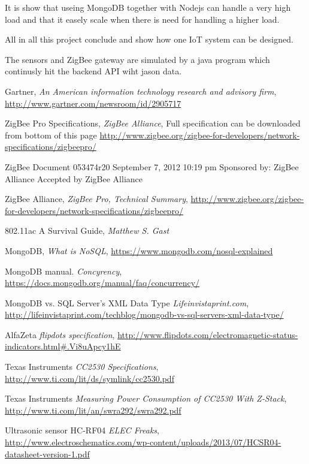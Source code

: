 \documentclass[a4paper,12pt,english]{article}
\begin{document}
It is show that useing MongoDB together with Nodejs can handle a very high
load and that it easely scale when there is need for handling a higher load.

All in all this project conclude and show how one IoT system can be designed. 
\clearpage



  The sensors and ZigBee gateway are simulated by a java program which
  continusly hit the backend API wiht jason data. 

\begin{thebibliography}{9}


  Gartner,
  \emph{ An American information technology research and advisory
  firm}, \url{http://www.gartner.com/newsroom/id/2905717}

ZigBee Pro Specifications,
\emph{ZigBee Alliance},
Full specification can
be downloaded from
bottom of this page
\url{http://www.zigbee.org/zigbee-for-developers/network-specifications/zigbeepro/}

ZigBee Document 053474r20
September 7, 2012 10:19 pm
Sponsored by: ZigBee Alliance
Accepted by ZigBee Alliance

ZigBee Alliance,
\emph{ZigBee Pro, Technical Summary},
\url{http://www.zigbee.org/zigbee-for-developers/network-specifications/zigbeepro/}

802.11ac A Survival Guide,
\emph{Matthew S. Gast}


MongoDB,
\emph{What is NoSQL},
\url{https://www.mongodb.com/nosql-explained}

MongoDB manual.
\emph{Concyrency},
\url{https://docs.mongodb.org/manual/faq/concurrency/}

MongoDB vs. SQL Server’s XML Data Type
\emph{Lifeinvistaprint.com},
\url{http://lifeinvistaprint.com/techblog/mongodb-vs-sql-servers-xml-data-type/}

AlfaZeta
\emph{flipdots specification},
\url{http://www.flipdots.com/electromagnetic-status-indicators.html#.Vi8uApcy1hE}

Texas Instruments
\emph{CC2530 Specifications},
\url{http://www.ti.com/lit/ds/symlink/cc2530.pdf}

Texas Instruments
\emph{Measuring Power Consumption of CC2530 With Z-Stack},
\url{http://www.ti.com/lit/an/swra292/swra292.pdf}

Ultrasonic sensor HC-RF04
\emph{ELEC Freaks},
\url{http://www.electroschematics.com/wp-content/uploads/2013/07/HCSR04-datasheet-version-1.pdf}


\end{thebibliography}
\end{document}
